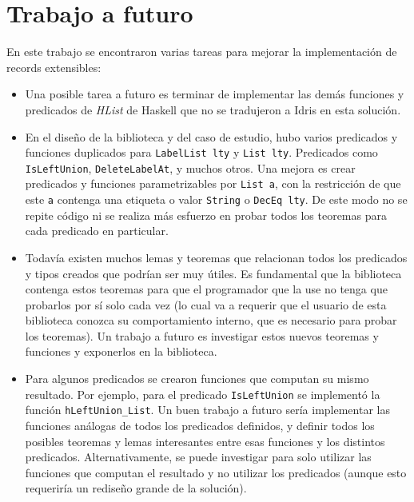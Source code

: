 
\chapter{Trabajo a futuro}
\label{ch:6}

En este trabajo se encontraron varias tareas para mejorar la implementación de records extensibles:

\begin{itemize}
\item Una posible tarea a futuro es terminar de implementar las demás funciones y predicados de \textit{HList} de Haskell que no se tradujeron a Idris en esta solución.

\item En el diseño de la biblioteca y del caso de estudio, hubo varios predicados y funciones duplicados para \texttt{LabelList lty} y \texttt{List lty}. Predicados como \texttt{IsLeftUnion}, \texttt{DeleteLabelAt}, y muchos otros. Una mejora es crear predicados y funciones parametrizables por \texttt{List a}, con la restricción de que este \texttt{a} contenga una etiqueta o valor \texttt{String} o \texttt{DecEq lty}. De este modo no se repite código ni se realiza más esfuerzo en probar todos los teoremas para cada predicado en particular.

\item Todavía existen muchos lemas y teoremas que relacionan todos los predicados y tipos creados que podrían ser muy útiles. Es fundamental que la biblioteca contenga estos teoremas para que el programador que la use no tenga que probarlos por sí solo cada vez (lo cual va a requerir que el usuario de esta biblioteca conozca su comportamiento interno, que es necesario para probar los teoremas). Un trabajo a futuro es investigar estos nuevos teoremas y funciones y exponerlos en la biblioteca.

\item Para algunos predicados se crearon funciones que computan su mismo resultado. Por ejemplo, para el predicado \texttt{IsLeftUnion} se implementó la función \texttt{hLeftUnion\_List}. Un buen trabajo a futuro sería implementar las funciones análogas de todos los predicados definidos, y definir todos los posibles teoremas y lemas interesantes entre esas funciones y los distintos predicados. Alternativamente, se puede investigar para solo utilizar las funciones que computan el resultado y no utilizar los predicados (aunque esto requeriría un rediseño grande de la solución).


\end{itemize}
